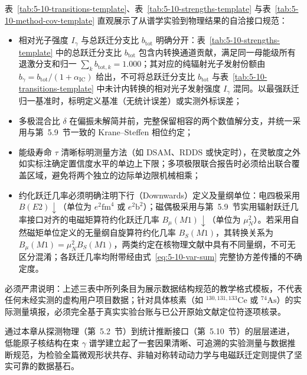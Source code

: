 表~\ref{tab:5-10-transitions-template}、表~\ref{tab:5-10-strengths-template} 与表~\ref{tab:5-10-method-cov-template} 直观展示了从谱学实验到物理结果的自洽接口规范：
\begin{itemize}
\item 相对光子强度 $I_\gamma$ 与总跃迁分支比 $b_{\mathrm{tot}}$ 明确分开：表~\ref{tab:5-10-strengths-template} 中的总跃迁分支比 $b_{\mathrm{tot}}$ 包含内转换通道贡献，满足同一母能级所有退激分支和归一 $\sum_k b_{\mathrm{tot}, k} = 1.000$；其对应的纯辐射光子发射份额由 $b_\gamma = b_{\mathrm{tot}} / (1 + \alpha_{\mathrm{IC}})$ 给出，不可将总跃迁分支比 $b_{\mathrm{tot}}$ 与表~\ref{tab:5-10-transitions-template} 中未计内转换的相对光子发射强度 $I_\gamma$ 混同。以最强跃迁归一基准时，标明定义基准（无统计误差）或实测外标误差；
\item 多极混合比 $\delta$ 在偏振未解简并前，完整保留相容的两个数值解分支，并统一采用与第~5.9~节一致的 Krane--Steffen 相位约定；
\item 能级寿命 $\tau$ 清晰标明测量方法（如 DSAM、RDDS 或快定时），在灵敏度之外如实标注确定置信度水平的单边上下限；多项极限联合报告时必须给出联合覆盖区域，避免将两个独立的边际单边限机械相乘；
\item 约化跃迁几率必须明确注明下行（Downwards）定义及量纲单位：电四极采用 $B(E2)\downarrow$（单位为 $e^2\text{fm}^4$ 或 $e^2\text{b}^2$）；磁偶极采用与第~5.9~节实用辐射跃迁几率接口对齐的电磁矩算符约化跃迁几率 $B_\mu(M1)\downarrow$（单位为 $\mu_N^2$）。若采用自然磁矩单位定义的无量纲自旋算符约化几率 $B_S(M1)$，其转换关系为 $B_\mu(M1) = \mu_N^2 B_S(M1)$，两类约定在核物理文献中具有不同量纲，不可无区分混淆；各跃迁几率均附带经由式~\eqref{eq:5-10-var-sum} 完整协方差传播的不确定度。
\end{itemize}
必须严肃说明：上述三表中所列条目为展示数据结构规范的教学格式模板，不代表任何未经实测的虚构用户项目数据；针对具体核素（如 $^{130, 131, 133}\mathrm{Ce}$ 或 $^{74}\mathrm{As}$）的实际测量填报，必须完全基于真实实验台账与已公开原始文献定位符逐项核录。

通过本章从探测物理（第~5.2~节）到统计推断接口（第~5.10~节）的层层递进，低能原子核结构在束 $\gamma$ 谱学建立起了一套因果清晰、可追溯的实验测量与数据推断规范，为检验全篇微观形状共存、非轴对称转动动力学与电磁跃迁定则提供了坚实可靠的数据基石。
